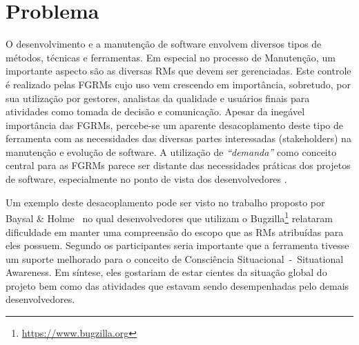 %

\section{Problema}
\label{sec:intro-problema}

O desenvolvimento e a manutenção de software envolvem diversos tipos de métodos,
técnicas e ferramentas. Em especial no processo de Manutenção, um importante
aspecto são as diversas RMs que devem ser gerenciadas. Este controle é realizado
pelas FGRMs cujo uso vem crescendo em importância, sobretudo, por sua utilização
por gestores, analistas da qualidade e usuários finais para atividades como
tomada de decisão e comunicação. Apesar da inegável importância das FGRMs,
percebe-se um aparente desacoplamento deste tipo de ferramenta com as
necessidades das diversas partes interessadas (stakeholders) na manutenção e
evolução de software. A utilização de \textit{``demanda''} como conceito central
para as FGRMs parece ser distante das necessidades práticas dos projetos de
software, especialmente no ponto de vista dos desenvolvedores
\cite{Baysal:2013:SAP:2486788.2486957}.


Um exemplo deste desacoplamento pode ser visto no trabalho proposto por Baysal
\& Holme~\cite{baysal2012qualitative} no qual desenvolvedores que utilizam o
Bugzilla\footnote{\url{https://www.bugzilla.org}} relataram dificuldade em
manter uma compreensão do escopo que as RMs atribuídas para eles possuem.
Segundo os participantes seria importante que a ferramenta tivesse um suporte
melhorado para o conceito de Consciência Situacional~-~Situational Awareness. Em
síntese, eles gostariam de estar cientes da situação global do projeto bem como
das atividades que estavam sendo desempenhadas pelo demais desenvolvedores.

